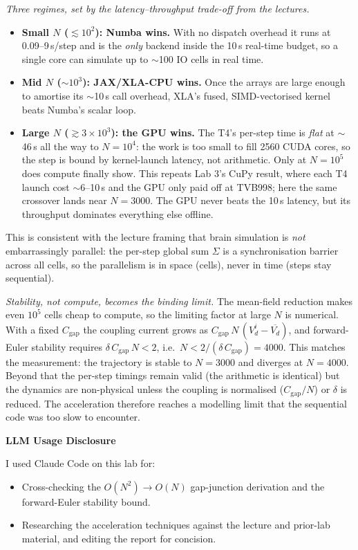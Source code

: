 \documentclass[11pt,a4paper]{article}
\begin{document}
\emph{Three regimes, set by the latency--throughput trade-off from the lectures.}
\begin{itemize}\setlength\itemsep{0.1em}
    \item \textbf{Small $N$ ($\lesssim10^2$): Numba wins.} With no dispatch overhead it runs at 0.09--9\,\textmu s/step and is the \emph{only} backend inside the 10\,\textmu s real-time budget, so a single core can simulate up to $\sim$100 IO cells in real time.
    \item \textbf{Mid $N$ ($\sim10^3$): JAX/XLA-CPU wins.} Once the arrays are large enough to amortise its $\sim$10\,\textmu s call overhead, XLA's fused, SIMD-vectorised kernel beats Numba's scalar loop.
    \item \textbf{Large $N$ ($\gtrsim3\times10^3$): the GPU wins.} The T4's per-step time is \emph{flat} at $\sim$46\,\textmu s all the way to $N=10^4$: the work is too small to fill 2560 CUDA cores, so the step is bound by kernel-launch latency, not arithmetic. Only at $N=10^5$ does compute finally show. This repeats Lab 3's CuPy result, where each T4 launch cost $\sim$6--10\,\textmu s and the GPU only paid off at TVB998; here the same crossover lands near $N=3000$. The GPU never beats the 10\,\textmu s latency, but its throughput dominates everything else offline.
\end{itemize}
This is consistent with the lecture framing that brain simulation is \emph{not} embarrassingly parallel: the per-step global sum $\Sigma$ is a synchronisation barrier across all cells, so the parallelism is in space (cells), never in time (steps stay sequential).

\emph{Stability, not compute, becomes the binding limit.} The mean-field reduction makes even $10^5$ cells cheap to compute, so the limiting factor at large $N$ is numerical. With a fixed $C_{\text{gap}}$ the coupling current grows as $C_{\text{gap}}\,N\,(V_d^i-\overline{V_d})$, and forward-Euler stability requires $\delta\,C_{\text{gap}}\,N < 2$, i.e.\ $N < 2/(\delta\,C_{\text{gap}}) = 4000$. This matches the measurement: the trajectory is stable to $N=3000$ and diverges at $N=4000$. Beyond that the per-step timings remain valid (the arithmetic is identical) but the dynamics are non-physical unless the coupling is normalised ($C_{\text{gap}}/N$) or $\delta$ is reduced. The acceleration therefore reaches a modelling limit that the sequential code was too slow to encounter.

\vspace{1em}

{\color{headingcolor}\sffamily\large\bfseries LLM Usage Disclosure}

\vspace{0.3em}

I used Claude Code on this lab for:
\begin{itemize}\setlength\itemsep{0.1em}
    \item Cross-checking the $O(N^2)\!\to\!O(N)$ gap-junction derivation and the forward-Euler stability bound.
    \item Researching the acceleration techniques against the lecture and prior-lab material, and editing the report for concision.
\end{itemize}
\end{document}
